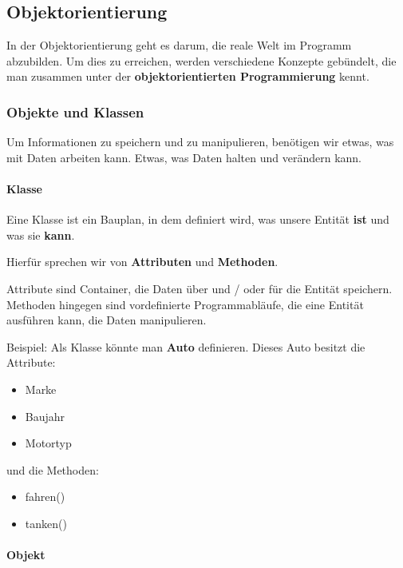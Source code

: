 \subsection{Objektorientierung}
\label{sec:Objektorientierung}

In der Objektorientierung geht es darum, die reale Welt im Programm abzubilden. Um dies zu erreichen, werden verschiedene Konzepte gebündelt, die man zusammen unter der \textbf{objektorientierten Programmierung} kennt.

\subsubsection{Objekte und Klassen}

Um Informationen zu speichern und zu manipulieren, benötigen wir etwas, was mit Daten arbeiten kann. Etwas, was Daten halten und verändern kann.

\paragraph{Klasse}

Eine Klasse ist ein Bauplan, in dem definiert wird, was unsere Entität \textbf{ist} und was sie \textbf{kann}.

Hierfür sprechen wir von \textbf{Attributen} und \textbf{Methoden}.

Attribute sind Container, die Daten über und / oder für die Entität speichern.
Methoden hingegen sind vordefinierte Programmabläufe, die eine Entität ausführen kann, die Daten manipulieren.

\newpage

\begin{mdframed}
	Beispiel: Als Klasse könnte man \textbf{Auto} definieren. Dieses Auto besitzt die Attribute:
	\begin{itemize}
		\item Marke
		\item Baujahr
		\item Motortyp
	\end{itemize}
	und die Methoden:
	\begin{itemize}
		\item fahren()
		\item tanken()
	\end{itemize}
\end{mdframed}

\paragraph{Objekt}

